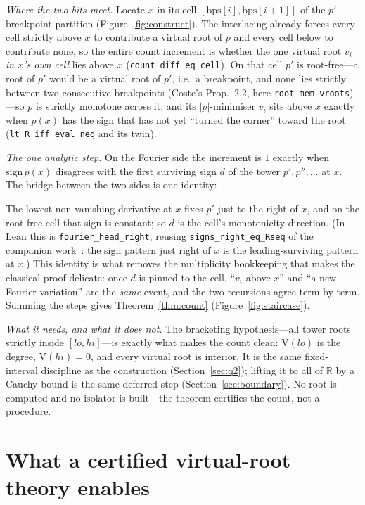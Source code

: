 \documentclass[11pt]{article}
\newcommand{\lean}[1]{\texttt{#1}}
\newcommand{\R}{\mathbb{R}}
\newcommand{\V}{\mathrm{V}}
\newcommand{\keyeq}[1]{\begin{center}\keybox{$\displaystyle #1$}\end{center}}
\begin{document}
\emph{Where the two bits meet.} Locate $x$ in its cell $[\mathrm{bps}[i],\mathrm{bps}[i+1]]$ of the
$p'$-breakpoint partition (Figure~\ref{fig:construct}). The interlacing already forces every cell
strictly above $x$ to contribute a virtual root of $p$ and every cell below to contribute none, so the
entire count increment is whether the one virtual root $v_i$ \emph{in $x$'s own cell} lies above $x$
(\lean{count\_diff\_eq\_cell}). On that cell $p'$ is root-free---a root of $p'$ would be a virtual root
of $p'$, i.e.\ a breakpoint, and none lies strictly between two consecutive breakpoints (Coste's
Prop.~2.2, here \lean{root\_mem\_vroots})---so $p$ is strictly monotone across it, and its
$|p|$-minimiser $v_i$ sits above $x$ exactly when $p(x)$ has the sign that has not yet ``turned the
corner'' toward the root (\lean{lt\_R\_iff\_eval\_neg} and its twin).

\emph{The one analytic step.} On the Fourier side the increment is $1$ exactly when $\mathrm{sign}\,p(x)$
disagrees with the first surviving sign $d$ of the tower $p',p'',\dots$ at $x$. The bridge between the
two sides is one identity:
\keyeq{d \;=\; \text{the sign of } p' \text{ on } x\text{'s cell.}}
The lowest non-vanishing derivative at $x$ fixes $p'$ just to the right of $x$, and on the root-free
cell that sign is constant; so $d$ is the cell's monotonicity direction. (In Lean this is
\lean{fourier\_head\_right}, reusing \lean{signs\_right\_eq\_Rseq} of the companion
work~\cite{bflean}: the sign pattern just right of $x$ is the leading-surviving pattern at $x$.) This
identity is what removes the multiplicity bookkeeping that makes the classical proof delicate: once $d$
is pinned to the cell, ``$v_i$ above $x$'' and ``a new Fourier variation'' are the \emph{same} event,
and the two recursions agree term by term. Summing the steps gives Theorem~\ref{thm:count}
(Figure~\ref{fig:staircase}).

\emph{What it needs, and what it does not.} The bracketing hypothesis---all tower roots strictly inside
$[lo,hi]$---is exactly what makes the count clean: $\V(lo)$ is the degree, $\V(hi)=0$, and every
virtual root is interior. It is the same fixed-interval discipline as the construction
(Section~\ref{sec:q2}); lifting it to all of $\R$ by a Cauchy bound is the same deferred step
(Section~\ref{sec:boundary}). No root is computed and no isolator is built---the theorem certifies the
count, not a procedure.

\section{What a certified virtual-root theory enables}\label{sec:enables}
\end{document}

